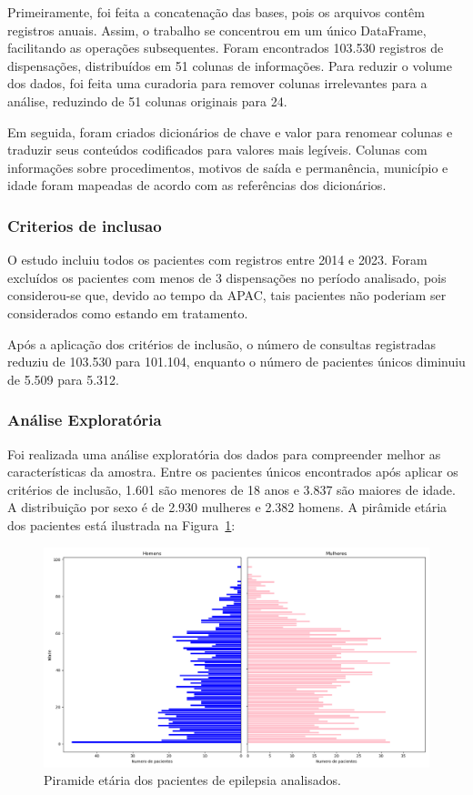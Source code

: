 \documentclass[article,a4paper,12pt,brazil,sumario=tradicional]{abntex2}
\begin{document}
Primeiramente, foi feita a concatenação das bases, pois os arquivos contêm registros anuais. Assim, o trabalho se concentrou em um único DataFrame, facilitando as operações subsequentes. Foram encontrados 103.530 registros de dispensações, distribuídos em 51 colunas de informações. Para reduzir o volume dos dados, foi feita uma curadoria para remover colunas irrelevantes para a análise, reduzindo de 51 colunas originais para 24.

Em seguida, foram criados dicionários de chave e valor para renomear colunas e traduzir seus conteúdos codificados para valores mais legíveis. Colunas com informações sobre procedimentos, motivos de saída e permanência, município e idade foram mapeadas de acordo com as referências dos dicionários.

\subsubsection{Criterios de inclusao}

O estudo incluiu todos os pacientes com registros entre 2014 e 2023. Foram excluídos os pacientes com menos de 3 dispensações no período analisado, pois considerou-se que, devido ao tempo da APAC, tais pacientes não poderiam ser considerados como estando em tratamento.

Após a aplicação dos critérios de inclusão, o número de consultas registradas reduziu de 103.530 para 101.104, enquanto o número de pacientes únicos diminuiu de 5.509 para 5.312.

\subsubsection{Análise Exploratória}

Foi realizada uma análise exploratória dos dados para compreender melhor as características da amostra. Entre os pacientes únicos encontrados após aplicar os critérios de inclusão, 1.601 são menores de 18 anos e 3.837 são maiores de idade. A distribuição por sexo é de 2.930 mulheres e 2.382 homens. A pirâmide etária dos pacientes está ilustrada na Figura~\ref{fig:piramide_etaria_completa}:

\begin{figure}[ht!]
    \centering
    \includegraphics[width=1\textwidth]{piramide_etaria_completa.png}
    \caption{Piramide etária dos pacientes de epilepsia analisados.}
    \label{fig:piramide_etaria_completa}
\end{figure}
\end{document}
